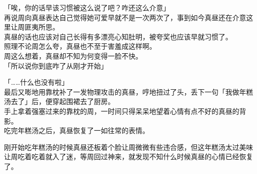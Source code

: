 「唉，你的话早该习惯被这么说了吧？咋还这么介意」\\

再说周向真昼表达自己觉得她可爱早就不是一次两次了，事到如今真昼还在介意这里让周匪夷所思。\\

真昼的话也应该对自己长得有多漂亮心知肚明，被夸奖也应该早就习惯了。\\

照理不论周怎么夸，真昼也不至于害羞成这样啊。\\

周这么想着，真昼却不知为何变得一脸不快。\\

「所以说你到底咋了从刚才开始」

「……什么也没有啦」\\

最后又嘭地用靠枕补了一发物理攻击的真昼，哼地扭过了头，丢下一句「我做年糕汤去了」后，便穿起围裙去了厨房。\\

手上拿着强塞过来的靠枕的周，一时间只得呆呆地望着心情有点不好的真昼的背影。\\



吃完年糕汤之后，真昼恢复了一如往常的表情。

刚开始吃年糕汤的时候真昼还板着个脸让周微微有些违合感，但这年糕汤太过美味让周吃着吃着就入了迷，等周回过神来，就发现不知什么时候真昼的心情已经恢复了。\\

